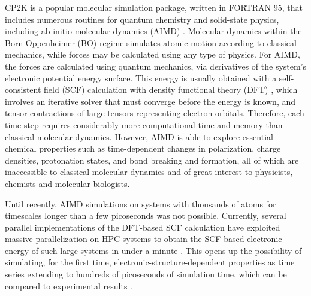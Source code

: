 CP2K \cite{hutter2014cp2k} is a popular molecular simulation package, written in FORTRAN 95, that includes numerous routines for quantum chemistry and solid-state physics, including ab initio molecular dynamics (AIMD) \cite{marx2009ab}. Molecular dynamics within the Born-Oppenheimer (BO) regime simulates atomic motion  according to classical mechanics, while forces may be calculated using any type of physics. For AIMD, the forces are calculated using quantum mechanics, via derivatives of the system's electronic potential energy surface. This energy is usually obtained with a self-consistent field (SCF) calculation with density functional theory (DFT) \cite{vandevondele2012linear,hutter2014cp2k}, which involves an iterative solver that must converge before the energy is known, and tensor contractions of large tensors representing electron orbitals. Therefore, each time-step requires considerably more computational time and memory than classical molecular dynamics. However, AIMD is able to explore essential chemical properties such as time-dependent changes in polarization, charge densities, protonation states, and bond breaking and formation, all of which are inaccessible to classical molecular dynamics and of great interest to physicists, chemists and molecular biologists.

Until recently, AIMD simulations on systems with thousands of atoms for timescales longer than a few picoseconds was not possible. Currently, several parallel implementations of the DFT-based SCF calculation have exploited massive parallelization on HPC systems to obtain the SCF-based electronic energy of such large systems in under a minute \cite{vasp_bench,kresse1996efficient,cp2k_bench,vandevondele2012linear}. This opens up the possibility of simulating, for the first time, electronic-structure-dependent properties as time series extending to hundreds of picoseconds of simulation time, which can be compared to experimental results \cite{gillan2016perspective, pestana2017ab, hassanali2013proton, milovanovic2018new, sellner2013charge}.

